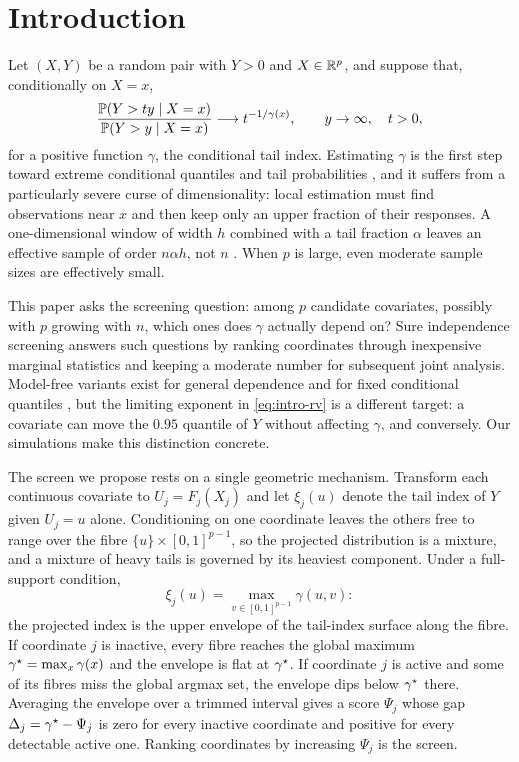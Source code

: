 \section{Introduction}\label{sec:intro}

Let $(X,Y)$ be a random pair with $Y>0$ and $X\in\mathbb R^p$, and suppose that,
conditionally on $X=x$,
\begin{equation}\label{eq:intro-rv}
 \frac{\mathbb P(Y>ty\mid X=x)}{\mathbb P(Y>y\mid X=x)}
 \longrightarrow t^{-1/\gamma(x)},\qquad y\to\infty,\quad t>0,
\end{equation}
for a positive function $\gamma$, the conditional tail index. Estimating
$\gamma$ is the first step toward extreme conditional quantiles and tail
probabilities \citep{deHaanFerreira2006,hill1975}, and it suffers from a
particularly severe curse of dimensionality: local estimation must find
observations near $x$ and then keep only an upper fraction of their
responses. A one-dimensional window of width $h$ combined with a tail
fraction $\alpha$ leaves an effective sample of order $n\alpha h$, not $n$
\citep{daouiaEtAl2013,gardesStupfler2014}. When $p$ is large, even moderate
sample sizes are effectively small.

This paper asks the screening question: among $p$ candidate covariates,
possibly with $p$ growing with $n$, which ones does $\gamma$ actually depend
on? Sure independence screening \citep{fanLv2008} answers such questions by
ranking coordinates through inexpensive marginal statistics and keeping a
moderate number for subsequent joint analysis. Model-free variants exist for
general dependence \citep{liZhongZhu2012} and for fixed conditional quantiles
\citep{heWangHong2013}, but the limiting exponent in \eqref{eq:intro-rv} is a
different target: a covariate can move the $0.95$ quantile of $Y$ without
affecting $\gamma$, and conversely. Our simulations make this distinction
concrete.

The screen we propose rests on a single geometric mechanism. Transform each
continuous covariate to $U_j=F_j(X_j)$ and let $\xi_j(u)$ denote the tail
index of $Y$ given $U_j=u$ alone. Conditioning on one coordinate leaves the
others free to range over the fibre $\{u\}\times[0,1]^{p-1}$, so the
projected distribution is a mixture, and a mixture of heavy tails is governed
by its heaviest component. Under a full-support condition,
\begin{equation}\label{eq:intro-envelope}
 \xi_j(u)=\max_{v\in[0,1]^{p-1}}\gamma(u,v):
\end{equation}
the projected index is the upper envelope of the tail-index surface along the
fibre. If coordinate $j$ is inactive, every fibre reaches the global maximum
$\gamma^\star=\max_x\gamma(x)$ and the envelope is flat at $\gamma^\star$. If coordinate
$j$ is active and some of its fibres miss the global argmax set, the envelope
dips below $\gamma^\star$ there. Averaging the envelope over a trimmed interval
gives a score $\Psi_j$ whose gap $\Delta_j=\gamma^\star-\Psi_j$ is zero for every
inactive coordinate and positive for every detectable active one. Ranking
coordinates by increasing $\Psi_j$ is the screen.

